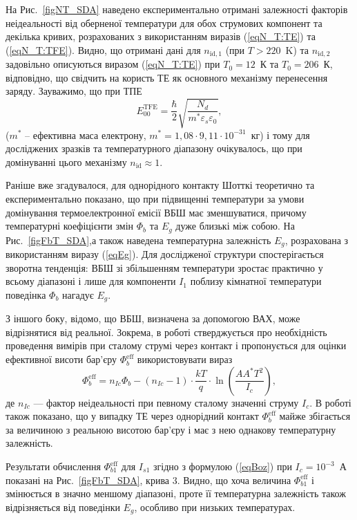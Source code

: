 На Рис.~\ref{figNT_SDA} наведено експериментально отримані залежності факторів неідеальності від оберненої температури
для обох струмових компонент та декілька кривих, розрахованих з використанням виразів (\ref{eqN_T:TE}) та (\ref{eqN_T:TFE}).
Видно, що отримані дані для $n_{\mathrm{id},1}$ (при $T>220$~K) та $n_{\mathrm{id},2}$ задовільно описуються
виразом (\ref{eqN_T:TE}) при $T_0=12$~К та $T_0=206$~К, відповідно,
що свідчить на користь ТЕ як основного механізму перенесення заряду.
Зауважимо, що при ТПЕ
\begin{equation}\label{eqE00:TFE}
E_{00}^\mathrm{TFE}=\frac{\hbar}{2}\sqrt{\frac{N_d}{m^*\varepsilon_s\varepsilon_0}},
\end{equation}
($m^*$ -- ефективна маса електрону, $m^*=1,08\cdot9,11\cdot10^{-31}$~кг)
і тому для досліджених зразків та температурного діапазону очікувалось, що при домінуванні цього механізму $n_\mathrm{id}\approx1$.



Раніше вже згадувалося, для однорідного контакту Шотткі теоретично \cite{Rhoderick1988} та експериментально \cite{Aboelfotoh,Zhua} показано,
що при підвищенні температури за умови домінування термоелектронної емісії ВБШ має зменшуватися,
причому температурні коефіцієнти змін $\Phi_b$ та  $E_g$ дуже близькі між собою.
На Рис.~\ref{figFbT_SDA},а також наведена температурна залежність $E_g$, розрахована з використанням
виразу (\ref{eqEg}).
Для дослідженої структури спостерігається зворотна тенденція: ВБШ зі збільшенням температури зростає практично у всьому
діапазоні
і лише для компоненти $I_1$ поблизу кімнатної температури поведінка $\Phi_b$ нагадує $E_g$.

З іншого боку, відомо, що ВБШ, визначена за допомогою ВАХ, може відрізнятися від реальної.
Зокрема, в роботі \cite{Bozhkov} стверджується про необхідність проведення вимірів при сталому струмі через контакт
і пропонується для оцінки ефективної висоти бар'єру $\Phi_{b}^\mathrm{eff}$ використовувати вираз
\begin{equation}\label{eqBoz}
\Phi_{b}^\mathrm{eff}=n_{Ic}\Phi_b-(n_{Ic}-1)\cdot\frac{kT}{q}\cdot\ln\left(\frac{AA^*T^2}{I_c}\right),
\end{equation}
де
$n_{Ic}$ --- фактор неідеальності при певному сталому значенні струму $I_c$.
В роботі \cite{Bozhkov} також показано, що у випадку ТЕ через однорідний контакт $\Phi_{b}^\mathrm{eff}$ майже збігається за величиною
з реальною висотою бар'єру і має з нею однакову температурну залежність.

Результати обчислення $\Phi_{b1}^\mathrm{eff}$ для $I_{s1}$ згідно з формулою (\ref{eqBoz}) при $I_c=10^{-3}$~А показані на Рис.~\ref{figFbT_SDA}, крива 3.
Видно, що хоча величина $\Phi_{b1}^\mathrm{eff}$ і змінюється в значно меншому діапазоні,
проте її температурна залежність також відрізняється від поведінки $E_g$, особливо при низьких температурах.


